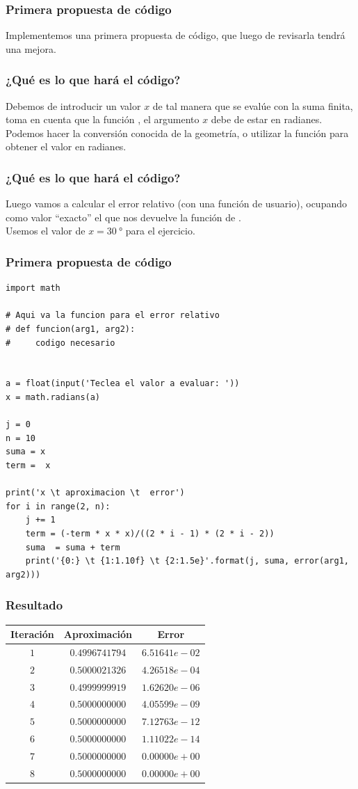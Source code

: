 \documentclass[12pt]{beamer}
\begin{document}
\begin{frame}
\frametitle{Primera propuesta de código}
Implementemos una primera propuesta de código, que luego de revisarla tendrá una mejora.
\end{frame}
\begin{frame}
\frametitle{¿Qué es lo que hará el código?}
Debemos de introducir un valor $x$ de tal manera que se evalúe con la suma finita, toma en cuenta que la función , el argumento $x$ debe de estar en radianes.
\\
\bigskip
\pause
Podemos hacer la conversión conocida de la geometría, \pause o utilizar la función  para obtener el valor en radianes.
\end{frame}
\begin{frame}
\frametitle{¿Qué es lo que hará el código?}
Luego vamos a calcular el error relativo (con una función de usuario), ocupando como valor \enquote{exacto} el que nos devuelve la función  de \python.
\\
\bigskip
\pause
Usemos el valor de $x = \SI{30}{\degree}$ para el ejercicio.
\end{frame}
\begin{frame}
\frametitle{Primera propuesta de código}
\begin{lstlisting}[caption=Código para aproximar sen(x)]
import math

# Aqui va la funcion para el error relativo
# def funcion(arg1, arg2):
#     codigo necesario


a = float(input('Teclea el valor a evaluar: '))
x = math.radians(a)

j = 0
n = 10
suma = x
term =  x

print('x \t aproximacion \t  error')
for i in range(2, n):
    j += 1
    term = (-term * x * x)/((2 * i - 1) * (2 * i - 2))
    suma  = suma + term
    print('{0:} \t {1:1.10f} \t {2:1.5e}'.format(j, suma, error(arg1, arg2)))
\end{lstlisting}
\end{frame}
\begin{frame}
\frametitle{Resultado}
\begin{table}
\renewcommand{\arraystretch}{0.8}
\begin{tabular}{c c c}
Iteración & Aproximación & Error \\ \hline
$1$ & $0.4996741794$ & $6.51641e-02$ \\
$2$ & $0.5000021326$ & $4.26518e-04$ \\
$3$ & $0.4999999919$ & $1.62620e-06$ \\
$4$ & $0.5000000000$ & $4.05599e-09$ \\
$5$ & $0.5000000000$ & $7.12763e-12$ \\
$6$ & $0.5000000000$ & $1.11022e-14$ \\
$7$ & $0.5000000000$ & $0.00000e+00$ \\
$8$ & $0.5000000000$ & $0.00000e+00$ \\
\end{tabular}
\end{table}
\end{frame}
\end{document}
